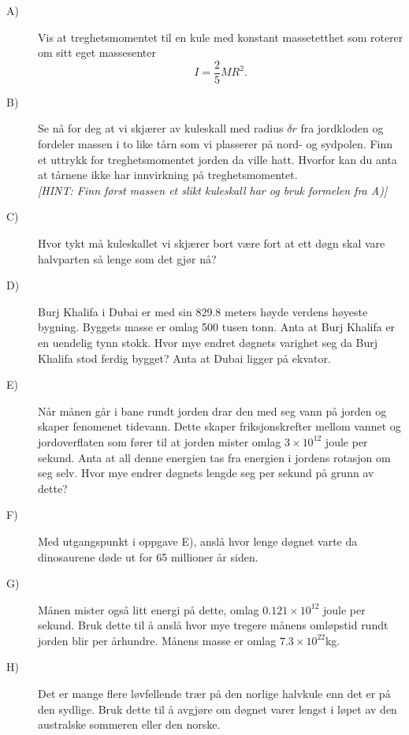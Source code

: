 \documentclass[twoside,utf8]{article}
\begin{document}
\begin{description}
  \item[A)] Vis at treghetsmomentet til en kule med konstant massetetthet som roterer om sitt eget massesenter
  \[ I = \frac{2}{5}MR^2. \]

  \item[B)] Se nå for deg at vi skjærer av kuleskall med radius $\delta r$ fra jordkloden og fordeler massen i to like tårn som vi plasserer på nord- og sydpolen. Finn et uttrykk for treghetsmomentet jorden da ville hatt. Hvorfor kan du anta at tårnene ikke har innvirkning på treghetsmomentet. \\
  {\it [HINT: Finn først massen et slikt kuleskall har og bruk formelen fra A)]}

  \item[C)] Hvor tykt må kuleskallet vi skjærer bort være fort at ett døgn skal vare halvparten så lenge som det gjør nå?

  \item[D)] Burj Khalifa i Dubai er med sin 829.8 meters høyde verdens høyeste bygning. Byggets masse er omlag 500 tusen tonn. Anta at Burj Khalifa er en uendelig tynn stokk. Hvor mye endret døgnets varighet seg da Burj Khalifa stod ferdig bygget? Anta at Dubai ligger på ekvator.

  \item[E)] Når månen går i bane rundt jorden drar den med seg vann på jorden og skaper fenomenet tidevann. Dette skaper friksjonskrefter mellom vannet og jordoverflaten som fører til at jorden mister omlag $3 \times 10^{12}$ joule per sekund. Anta at all denne energien tas fra energien i jordens rotasjon om seg selv. Hvor mye endrer døgnets lengde seg per sekund på grunn av dette?

  \item[F)] Med utgangspunkt i oppgave E), anslå hvor lenge døgnet varte da dinosaurene døde ut for 65 millioner år siden.

  \item[G)] Månen mister også litt energi på dette, omlag $0.121 \times 10^{12}$ joule per sekund. Bruk dette til å anslå hvor mye tregere månens omløpstid rundt jorden blir per århundre. Månens masse er omlag $7.3 \times 10^{22}$kg.

  \item[H)] Det er mange flere løvfellende trær på den norlige halvkule enn det er på den sydlige. Bruk dette til å avgjøre om døgnet varer lengst i løpet av den australske sommeren eller den norske.
\end{description}
\end{document}
